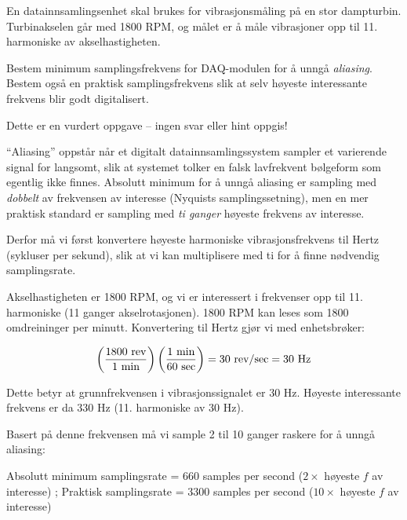 

En datainnsamlingsenhet skal brukes for vibrasjonsmåling på en stor dampturbin. Turbinakselen går med 1800 RPM, og målet er å måle vibrasjoner opp til 11. harmoniske av akselhastigheten.

\vskip 10pt

Bestem minimum samplingsfrekvens for DAQ-modulen for å unngå {\it aliasing}. Bestem også en praktisk samplingsfrekvens slik at selv høyeste interessante frekvens blir godt digitalisert.

\vfil 

\eject






Dette er en vurdert oppgave -- ingen svar eller hint oppgis!







``Aliasing'' oppstår når et digitalt datainnsamlingssystem sampler et varierende signal for langsomt, slik at systemet tolker en falsk lavfrekvent bølgeform som egentlig ikke finnes. Absolutt minimum for å unngå aliasing er sampling med {\it dobbelt} av frekvensen av interesse (Nyquists samplingssetning), men en mer praktisk standard er sampling med {\it ti ganger} høyeste frekvens av interesse.

Derfor må vi først konvertere høyeste harmoniske vibrasjonsfrekvens til Hertz (sykluser per sekund), slik at vi kan multiplisere med ti for å finne nødvendig samplingsrate.

\vskip 30pt

Akselhastigheten er 1800 RPM, og vi er interessert i frekvenser opp til 11. harmoniske (11 ganger akselrotasjonen). 1800 RPM kan leses som 1800 omdreininger per minutt. Konvertering til Hertz gjør vi med enhetsbrøker:

$$\left(1800 \hbox{ rev} \over 1 \hbox{ min} \right) \left(1 \hbox{ min} \over 60 \hbox{ sec} \right) = 30 \hbox{ rev/sec} = 30 \hbox{ Hz}$$

Dette betyr at grunnfrekvensen i vibrasjonssignalet er 30 Hz. Høyeste interessante frekvens er da 330 Hz (11. harmoniske av 30 Hz).

\vskip 30pt

Basert på denne frekvensen må vi sample 2 til 10 ganger raskere for å unngå aliasing:

\vskip 10pt

Absolutt minimum samplingsrate = 660 samples per second ($2 \times$ høyeste $f$ av interesse) ; Praktisk samplingsrate = 3300 samples per second ($10 \times$ høyeste $f$ av interesse)


